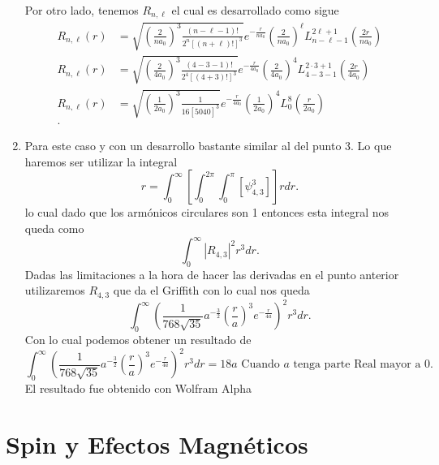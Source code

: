 \documentclass{report}
\begin{document}
\begin{enumerate}
	Por otro lado, tenemos $R_{n,\ell}$ el cual es desarrollado como sigue
	 \begin{align*}
		 R_{n,\ell}(r) &= \sqrt{\left( \frac{2}{na_0} \right)^3 \frac{(n-\ell-1)!}{2^n\left[ (n+\ell)! \right]^3 }}e^{-\frac{r}{na_0}}\left( \frac{2}{na_0} \right)^\ell L_{n-\ell-1}^{2\ell+1}\left( \frac{2r}{na_0} \right)   \\
		 R_{n,\ell}(r) &= \sqrt{\left( \frac{2}{4a_0} \right)^3 \frac{(4-3-1)!}{2^4\left[ (4+3)! \right]^3 }}e^{-\frac{r}{4a_0}}\left( \frac{2}{4a_0} \right)^4 L_{4-3-1}^{2\cdot3+1}\left( \frac{2r}{4a_0} \right)   \\
		 R_{n,\ell}(r) &= \sqrt{\left( \frac{1}{2a_0} \right)^3 \frac{1}{16\left[ 5040 \right]^3 }}e^{-\frac{r}{4a_0}}\left( \frac{1}{2a_0} \right)^4 L_{0}^{8}\left( \frac{r}{2a_0} \right)   \\
	.\end{align*}
\item Para este caso y con un desarrollo bastante similar al del punto 3. Lo que haremos ser utilizar la integral \[
		r = \int_0^{\infty}\left[ \int_0^{2\pi}\int_0^{\pi}\left[ \psi_{4,3}^3 \right]  \right] r dr
.\] lo cual dado que los armónicos circulares son 1 entonces esta integral nos queda como \[
\int_0^\infty |R_{4,3}|^2 r^3 dr
.\] Dadas las limitaciones a la hora de hacer las derivadas en el punto anterior utilizaremos $R_{4,3}$ que da el Griffith con lo cual nos queda \[
\int_0^\infty \left( \frac{1}{768\sqrt{35} }a^{-\frac{3}{2}}\left( \frac{r}{a} \right) ^3 e^{-\frac{r}{4a}} \right) ^2r^3 dr
.\] Con lo cual podemos obtener un resultado de \[
\int_0^\infty \left( \frac{1}{768\sqrt{35} }a^{-\frac{3}{2}}\left( \frac{r}{a} \right) ^3 e^{-\frac{r}{4a}} \right) ^2r^3 dr = 18a\text{ Cuando $a$ tenga parte Real mayor a 0}
.\] El resultado fue obtenido con Wolfram Alpha
\end{enumerate}

\section{Spin y Efectos Magnéticos}

\end{document}
